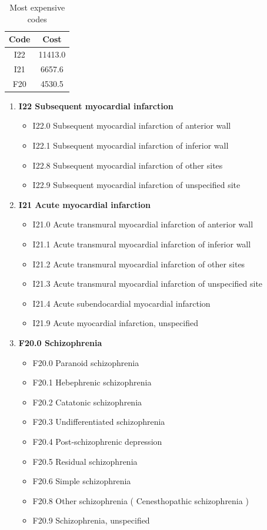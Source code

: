 \documentclass[10pt]{article}
\begin{document}
\begin{table}[H]
\center
\begin{tabular}{|c|c|}
\hline
\textbf{Code}&\textbf{Cost}\\
\hline
I22 &	11413.0\\
\hline
I21 &	6657.6\\
\hline
F20 &	4530.5\\
\hline
\end{tabular}
\caption{Most expensive codes \label{table:3}}
\begin{enumerate}
\item \textbf{I22 Subsequent myocardial infarction}
\begin{itemize}
\item I22.0 Subsequent myocardial infarction of anterior wall
\item I22.1 Subsequent myocardial infarction of inferior wall
\item I22.8 Subsequent myocardial infarction of other sites
\item I22.9 Subsequent myocardial infarction of unspecified site
\end{itemize}
\item \textbf{I21 Acute myocardial infarction}
\begin{itemize}
\item I21.0 Acute transmural myocardial infarction of anterior wall
\item I21.1 Acute transmural myocardial infarction of inferior wall
\item I21.2 Acute transmural myocardial infarction of other sites
\item I21.3 Acute transmural myocardial infarction of unspecified site
\item I21.4 Acute subendocardial myocardial infarction
\item I21.9 Acute myocardial infarction, unspecified 
\end{itemize}
\item \textbf{F20.0 Schizophrenia}
\begin{itemize}
\item F20.0 Paranoid schizophrenia
\item F20.1 Hebephrenic schizophrenia
\item F20.2 Catatonic schizophrenia
\item F20.3 Undifferentiated schizophrenia
\item F20.4 Post-schizophrenic depression
\item F20.5 Residual schizophrenia
\item F20.6 Simple schizophrenia
\item F20.8 Other schizophrenia  ( Cenesthopathic schizophrenia )
\item  F20.9 Schizophrenia, unspecified
\end{itemize}
\end{enumerate}
\end{table}
\end{document}
